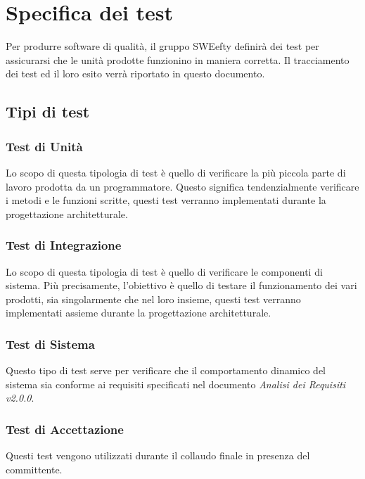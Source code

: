 \section{Specifica dei test}
Per produrre software di qualità, il gruppo SWEefty definirà dei test per assicurarsi che le unità prodotte funzionino in maniera corretta. Il tracciamento dei test ed il loro esito verrà riportato in questo documento.
	\subsection{Tipi di test}
		
	\subsubsection{Test di Unità}
    Lo scopo di questa tipologia di test è quello di verificare la più piccola parte di lavoro prodotta da un programmatore. Questo significa tendenzialmente verificare i metodi e le funzioni scritte, questi test verranno implementati durante la progettazione architetturale.
	
	\subsubsection{Test di Integrazione}
	Lo scopo di questa tipologia di test è quello di verificare le componenti di sistema. Più	precisamente, l’obiettivo è quello di testare il funzionamento dei vari  prodotti, sia singolarmente che nel loro insieme, questi test verranno implementati assieme durante la progettazione architetturale.
		
		
	\subsubsection{Test di Sistema}
	Questo tipo di test serve per verificare che il comportamento dinamico del sistema sia conforme ai requisiti specificati nel documento \textit{Analisi dei Requisiti v2.0.0}.
	
		
	\subsubsection{Test di Accettazione}
	Questi test vengono utilizzati durante il collaudo finale in presenza del committente.
	
	
